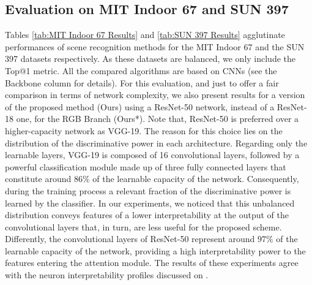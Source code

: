 \documentclass[review, 3p, sort&compress]{elsarticle}
\begin{document}
\subsection*{Evaluation on MIT Indoor 67 and SUN 397}
Tables \ref{tab:MIT Indoor 67 Results} and \ref{tab:SUN 397 Results} agglutinate performances of scene recognition methods for the MIT Indoor 67 and the SUN 397 datasets respectively. As these datasets are balanced, we only include the Top@1 metric. All the compared algorithms are based on CNNs (see the Backbone column for details). For this evaluation, and just to offer a fair comparison in terms of network complexity, we also present results for a version of the proposed method (Ours) using a ResNet-50 network, instead of a ResNet-18 one, for the RGB Branch (Ours*). Note that, ResNet-50 is preferred over a higher-capacity network as VGG-19. The reason for this choice lies on the distribution of the discriminative power in each architecture. Regarding only the learnable layers, VGG-19 is composed of 16 convolutional layers, followed by a powerful classification module made up of three fully connected layers that constitute around \(86 \%\) of the learnable capacity of the network. Consequently, during the training process a relevant fraction of the discriminative power is learned by the classifier. In our experiments, we noticed that this unbalanced distribution conveys features of a lower interpretability at the output of the convolutional layers that, in turn, are less useful for the proposed scheme. Differently, the convolutional layers of ResNet-50 represent around \(97 \%\) of the learnable capacity of the network, providing a high interpretability power to the features entering the attention module. The results of these experiments agree with the neuron interpretability profiles discussed on \cite{bau2017network}.
\end{document}
